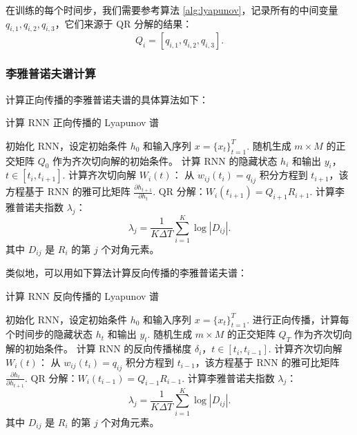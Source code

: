 在训练的每个时间步，我们需要参考算法 \ref{alg:lyapunov}，记录所有的中间变量 $q_{i,1}, q_{i, 2}, q_{i, 3}$，它们来源于 QR 分解的结果：
\begin{equation}
  Q_i = [q_{i,1}, q_{i,2}, q_{i,3}].
\end{equation}

\clearpage

\subsubsection{李雅普诺夫谱计算}

计算正向传播的李雅普诺夫谱的具体算法如下：

\begin{algorithm}[H]
  \caption{计算 RNN 正向传播的 Lyapunov 谱}
  \begin{algorithmic}[1]
  \STATE 初始化 RNN，设定初始条件 $h_0$ 和输入序列 $x = \{x_t\}_{t=1}^T$.
  \STATE 随机生成 $m \times M$ 的正交矩阵 $Q_0$ 作为齐次切向解的初始条件。
      \STATE 计算 RNN 的隐藏状态 $h_i$ 和输出 $y_i$，$t \in [t_i, t_{i+1}]$.
      \STATE 计算齐次切向解 $W_i(t)$：
          \STATE 从 $w_{ij}(t_i) = q_{ij}$ 积分方程到 $t_{i+1}$，该方程基于 RNN 的雅可比矩阵 $\frac{\partial h_{t+1}}{\partial h_t}$.
      \ENDFOR
      \STATE QR 分解：$W_i(t_{i+1}) = Q_{i+1} R_{i+1}$.
  \ENDFOR
  \STATE 计算李雅普诺夫指数 $\lambda_j$：
  \begin{equation}
  \lambda_j = \frac{1}{K \Delta T} \sum_{i=1}^K \log |D_{ij}|.
  \end{equation}
  其中 $D_{ij}$ 是 $R_i$ 的第 $j$ 个对角元素。
  \end{algorithmic}
\end{algorithm}

类似地，可以用如下算法计算反向传播的李雅普诺夫谱：

\begin{algorithm}[H]
  \caption{计算 RNN 反向传播的 Lyapunov 谱}
  \begin{algorithmic}[1]
  \STATE 初始化 RNN，设定初始条件 $h_0$ 和输入序列 $x = \{x_t\}_{t=1}^T$.
  \STATE 进行正向传播，计算每个时间步的隐藏状态 $h_t$ 和输出 $y_t$.
  \STATE 随机生成 $m \times M$ 的正交矩阵 $Q_T$ 作为齐次切向解的初始条件。
      \STATE 计算 RNN 的反向传播梯度 $\delta_i$，$t \in [t_i, t_{i-1}]$.
      \STATE 计算齐次切向解 $W_i(t)$：
          \STATE 从 $w_{ij}(t_i) = q_{ij}$ 积分方程到 $t_{i-1}$，该方程基于 RNN 的雅可比矩阵 $\frac{\partial h_{t}}{\partial h_{t+1}}$.
      \ENDFOR
      \STATE QR 分解：$W_i(t_{i-1}) = Q_{i-1} R_{i-1}$.
  \ENDFOR
  \STATE 计算李雅普诺夫指数 $\lambda_j$：
  \begin{equation}
    \lambda_j = \frac{1}{K \Delta T} \sum_{i=1}^K \log |D_{ij}|.
  \end{equation}
  其中 $D_{ij}$ 是 $R_i$ 的第 $j$ 个对角元素。
  \end{algorithmic}
\end{algorithm}


